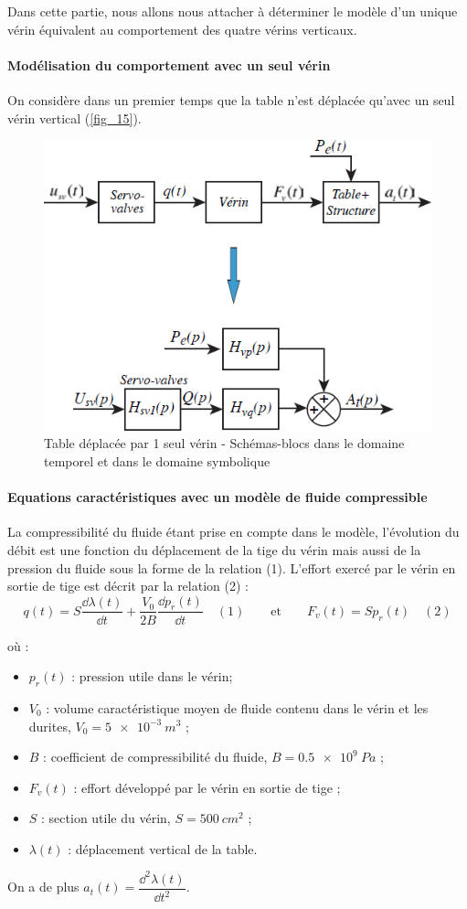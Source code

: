 \documentclass[10pt,fleqn]{article} %
\begin{document}
Dans cette partie, nous allons nous attacher à déterminer le modèle d’un unique vérin équivalent au comportement
des quatre vérins verticaux.

\paragraph{Modélisation du comportement avec un seul vérin}

On considère dans un premier temps que la table n’est déplacée qu’avec un seul vérin vertical (\autoref{fig_15}).

\begin{figure}[H]
\centering
\includegraphics[width=0.6\linewidth]{fig_15}
\caption{Table déplacée par 1 seul vérin - Schémas-blocs dans le domaine temporel et dans
le domaine symbolique \label{fig_15}}
\end{figure}

\paragraph{Equations caractéristiques avec un modèle de fluide compressible}

La compressibilité du fluide étant prise en compte dans le modèle, l’évolution du débit est une fonction du
déplacement de la tige du vérin mais aussi de la pression du fluide sous la forme de la relation (1). L’effort
exercé par le vérin en sortie de tige est décrit par la relation (2) :
$$q(t)=S\dfrac{\dd \lambda(t)}{\dd t}+\dfrac{V_0}{2B}\dfrac{\dd p_r(t)}{\dd t} \quad (1) 
\quad \quad  \text{et} \quad \quad
F_v(t)=Sp_r(t) \quad (2) $$

où :
\begin{itemize}
\item $p_r(t)$ : pression utile dans le vérin;
\item $V_0$ : volume caractéristique moyen de fluide contenu dans le vérin et les durites, $V_0 = \SI{5e-3}{m^3}$ ;
\item $B$ : coefficient de compressibilité du fluide, $B = \SI{0,5e9}{Pa}$ ;
\item $F_v (t)$ : effort développé par le vérin en sortie de tige ;
\item $S$ : section utile du vérin, $S = \SI{500}{cm^2}$ ;
\item $\lambda(t)$ : déplacement vertical de la table.
\end{itemize}
On a de plus $a_t(t) = \dfrac{\dd^2 \lambda(t)}{\dd t^2}$.
\end{document}
